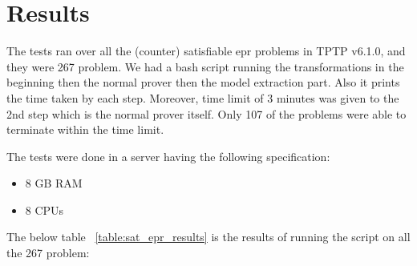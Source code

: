 \chapter{Results}\label{chap:res_and_lit}


The tests ran over all the (counter) satisfiable \ac{epr} problems in TPTP v6.1.0, and they were 267 problem. We had a bash script running the transformations in the beginning then the normal prover then the model extraction part. Also it prints the time taken by each step. Moreover, time limit of 3 minutes was given to the 2nd step which is the normal prover itself. Only 107 of the problems were able to terminate within the time limit. 


The tests were done in a server having the following specification:
\begin{itemize}
	\item 8 GB RAM
	\item 8 CPUs
\end{itemize}


The below table ~\ref{table:sat_epr_results} is the results of running the script on all the 267 problem:


